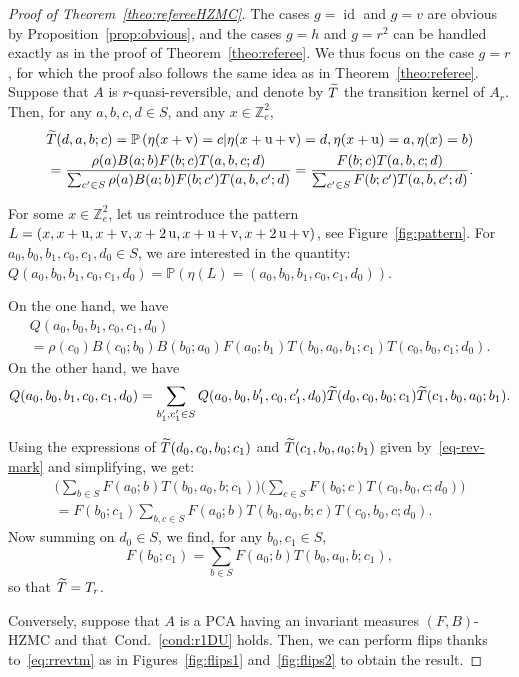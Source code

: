 \documentclass[AHL,Unicode,longabstracts]{cedram}
\let\oldtilde\tilde
\renewcommand*{\tilde}[1]{\mathchoice{\widetilde{#1}}{\widetilde{#1}}{\oldtilde{#1}}{\oldtilde{#1}}}
\newcounter{a}
\newcommand{\Cond}{Cond.}
\newcommand{\tT}{\tilde T}
\DeclareMathOperator{\id}{id}
\newcommand{\Z}{\mathbb{Z}}
\newcommand{\Pbb}{\mathbb{P}}
\DeclareMathOperator{\vu}{u}
\DeclareMathOperator{\vv}{v}
\begin{document}
\begin{proof}[Proof of Theorem~\ref{theo:refereeHZMC}] The cases $g=\id$ and $g=v$ are obvious by Proposition~\ref{prop:obvious}, and the cases $g=h$ and $g=r^2$ can be handled exactly as in the proof of Theorem~\ref{theo:referee}.
We thus focus on the case $g=r$, for which the proof also follows the same idea as in Theorem~\ref{theo:referee}.
Suppose that $A$ is $r$-quasi-reversible, and denote by $\tT$ the transition kernel of $A_r$. Then, for any $a,b,c,d\in S$, and any $x \in \Z_{e}^2$,
\begin{equation}\label{eq-rev-mark}
\begin{aligned}
\tT(d,a,b;c)= \Pbb\left(\eta(x+\vv)=c | \eta(x+\vu+\vv)=d,\eta(x+\vu)=a,\eta(x)=b\right)\\
= \frac{\rho(a) B(a;b) F(b;c) T(a,b,c;d)}{\sum_{c'\in S} \rho(a) B(a;b) F(b;c') T(a,b,c';d)} = \frac{F(b;c) T(a,b,c;d)}{\sum_{c'\in S} F(b;c') T(a,b,c';d)}.
\end{aligned}
\end{equation}

For some $x \in \Z_{e}^2$, let us reintroduce the pattern $L=(x,x+\vu,x+\vv, x+2\vu,\linebreak x+\vu+\vv,x+2\vu+\vv)$, see Figure~\ref{fig:pattern}. For $a_0,b_0,b_1,c_0,c_1,d_0 \in S$, we are interested in the quantity: $Q(a_0,b_0,b_1,c_0,c_1,d_0)=\Pbb\left(\eta(L)=(a_0,b_0,b_1,c_0,c_1,d_0)\right).$

On the one hand, we have
\begin{multline*}
Q(a_0,b_0,b_1,c_0,c_1,d_0)\\
=\rho(c_0) B(c_0;b_0) B(b_0;a_0) F(a_0;b_1) T(b_0,a_0,b_1;c_1) T(c_0,b_0,c_1;d_0).
\end{multline*}
On the other hand, we have
\[
Q(a_0,b_0,b_1,c_0,c_1,d_0)=\sum_{b'_1,c'_1\in S}Q(a_0,b_0,b'_1,c_0,c'_1,d_0)\tT(d_0,c_0,b_0;c_1)\tT(c_1,b_0,a_0;b_1).
\]

Using the expressions of $\tT(d_0,c_0,b_0;c_1)$ and $\tT(c_1,b_0,a_0;b_1)$ given by~\eqref{eq-rev-mark} and simplifying, we get:
\begin{multline*}
\bigg(\sum_{b\in S} F(a_0;b) T(b_0,a_0,b;c_1) \bigg) \bigg(\sum_{c\in S} F(b_0;c) T(c_0,b_0,c;d_0) \bigg)\\
= F(b_0;c_1) \sum_{b,c\in S} F(a_0;b) T(b_0,a_0,b;c) T(c_0,b_0,c;d_0).
\end{multline*}
Now summing on $d_0 \in S$, we find, for any $b_0,c_1\in S$,
\[
F(b_0;c_1) = \sum_{b\in S} F(a_0;b) T(b_0,a_0,b;c_1),
\]
so that $\tT=T_r$.

Conversely, suppose that $A$ is a PCA having an invariant measures $(F,B)$-HZMC and that~\Cond~\ref{cond:r1DU} holds. Then, we can perform flips thanks to~\eqref{eq:rrevtm} as in Figures~\ref{fig:flips1} and~\ref{fig:flips2} to obtain the result.
\end{proof}
\end{document}
